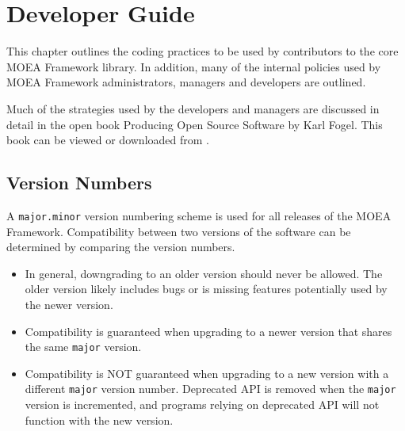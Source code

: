 %
%

\chapter{Developer Guide}

This chapter outlines the coding practices to be used by contributors to the core MOEA Framework library.  In addition, many of the internal policies used by MOEA Framework administrators, managers and developers are outlined.

Much of the strategies used by the developers and managers are discussed in detail in the open book Producing Open Source Software by Karl Fogel.  This book can be viewed or downloaded from .

\section{Version Numbers}
A \texttt{major.minor} version numbering scheme is used for all releases of the MOEA Framework.  Compatibility between two versions of the software can be determined by comparing the version numbers.

\begin{itemize}
  \item In general, downgrading to an older version should never be allowed.  The older version likely includes bugs or is missing features potentially used by the newer version.

  \item Compatibility is guaranteed when upgrading to a newer version that shares the same \texttt{major} version.

  \item Compatibility is NOT guaranteed when upgrading to a new version with a different \texttt{major} version number.  Deprecated API is removed when the \texttt{major} version is incremented, and programs relying on deprecated API will not function with the new version.
\end{itemize}

